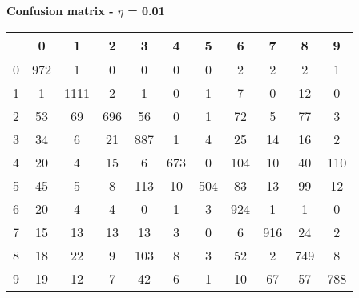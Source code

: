\documentclass{article}
\begin{document}
\begin{table}[h!]
    \begin{center}
        \centerline\textbf{{Confusion matrix - $\eta$ = 0.01}}
        \begin{tabular}{| c | c | c | c | c | c | c | c | c | c | c |}
            \hline
              & 0 & 1 & 2 & 3 & 4 & 5 & 6 & 7 & 8 & 9 \\ 
            \hline
            0 & 972	& 1	& 0	& 0	& 0	& 0	& 2	& 2	& 2	& 1 \\
            \hline
            1 & 1	& 1111	& 2	& 1	& 0	& 1	& 7	& 0	& 12 & 0 \\
            \hline
            2 & 53 & 69 & 696 & 56 & 0 & 1 & 72 & 5 & 77 & 3 \\
            \hline
            3 & 34 & 6 & 21 & 887 & 1 & 4 & 25 & 14 & 16 & 2 \\ 
            \hline
            4 & 20 & 4 & 15 & 6 & 673 & 0 & 104 & 10 & 40 & 110 \\
            \hline
            5 & 45 & 5 & 8 & 113 & 10 & 504 & 83 & 13 & 99 & 12 \\
            \hline
            6 & 20 & 4 & 4 & 0 & 1 & 3 & 924 & 1 & 1 & 0 \\
            \hline
            7 & 15 & 13 & 13 & 13 & 3 & 0 & 6 & 916 & 24 & 2 \\
            \hline
            8 & 18 & 22 & 9 & 103 & 8 & 3 & 52 & 2 & 749 & 8 \\
            \hline
            9 & 19 & 12 & 7 & 42 & 6 & 1 & 10 & 67 & 57 & 788 \\
            \hline
        \end{tabular}
    \end{center}
\end{table}

\clearpage

\begin{figure}[h!]
\centering
{}
\end{figure}
\end{document}

